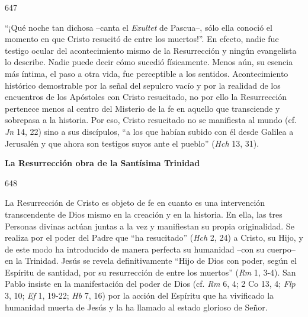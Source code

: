 			\begin{ccebody}\textbf{La Resurrección como acontecimiento transcendente}}\end{ccebody}
			
			\begin{ccebody}\begin{ccenumber}647\end{ccenumber} “¡Qué noche tan dichosa –canta el \textit{Exultet} de Pascua–, sólo ella conoció el momento en que Cristo resucitó de entre los muertos!”. En efecto, nadie fue testigo ocular del acontecimiento mismo de la Resurrección y ningún evangelista lo describe. Nadie puede decir cómo sucedió físicamente. Menos aún, su esencia más íntima, el paso a otra vida, fue perceptible a los sentidos. Acontecimiento histórico demostrable por la señal del sepulcro vacío y por la realidad de los encuentros de los Apóstoles con Cristo resucitado, no por ello la Resurrección pertenece menos al centro del Misterio de la fe en aquello que transciende y sobrepasa a la historia. Por eso, Cristo resucitado no se manifiesta al mundo (cf. \textit{Jn} 14, 22) sino a sus discípulos, “a los que habían subido con él desde Galilea a Jerusalén y que ahora son testigos suyos ante el pueblo” (\textit{Hch} 13, 31).\end{ccebody}
			
			\begin{ccebody}\textbf{La Resurrección obra de la Santísima Trinidad} \end{ccebody}
			
			\begin{ccebody}\begin{ccenumber}648\end{ccenumber} La Resurrección de Cristo es objeto de fe en cuanto es una intervención transcendente de Dios mismo en la creación y en la historia. En ella, las tres Personas divinas actúan juntas a la vez y manifiestan su propia originalidad. Se realiza por el poder del Padre que “ha resucitado” (\textit{Hch} 2, 24) a Cristo, su Hijo, y de este modo ha introducido de manera perfecta su humanidad –con su cuerpo– en la Trinidad. Jesús se revela definitivamente “Hijo de Dios con poder, según el Espíritu de santidad, por su resurrección de entre los muertos” (\textit{Rm} 1, 3-4). San Pablo insiste en la manifestación del poder de Dios (cf. \textit{Rm} 6, 4; 2 Co 13, 4; \textit{Flp} 3, 10; \textit{Ef} 1, 19-22; \textit{Hb} 7, 16) por la acción del Espíritu que ha vivificado la humanidad muerta de Jesús y la ha llamado al estado glorioso de Señor.\end{ccebody}
			
